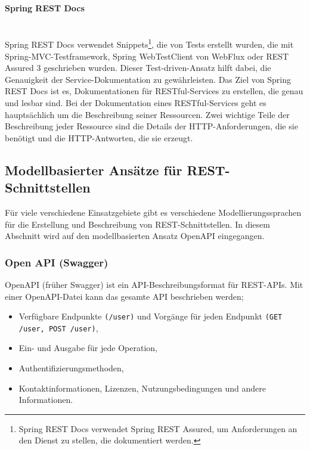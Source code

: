 \paragraph{Spring REST Docs}\mbox{}\\

Spring REST Docs verwendet Snippets\footnote{Spring REST Docs verwendet Spring REST Assured, um Anforderungen an den Dienst zu stellen, die dokumentiert werden.}, die von Tests erstellt wurden, die mit Spring-MVC-Testframework, Spring WebTestClient von WebFlux oder REST Assured 3 geschrieben wurden. Dieser Test-driven-Ansatz hilft dabei, die Genauigkeit der Service-Dokumentation zu gewährleisten. Das Ziel von Spring REST Docs ist es, Dokumentationen für RESTful-Services zu erstellen, die genau und lesbar sind. Bei der Dokumentation eines RESTful-Services geht es hauptsächlich um die Beschreibung seiner Ressourcen. Zwei wichtige Teile der Beschreibung jeder Ressource sind die Details der HTTP-Anforderungen, die sie benötigt und die HTTP-Antworten, die sie erzeugt\cite{srd18wilkinson}.

\subsection{Modellbasierter Ansätze für REST-Schnittstellen}

Für viele verschiedene Einsatzgebiete gibt es verschiedene Modellierungssprachen für die Erstellung und Beschreibung von REST-Schnittstellen. In diesem Abschnitt wird auf den modellbasierten Ansatz OpenAPI eingegangen.

\subsubsection{Open API (Swagger)}

OpenAPI (früher Swagger) ist ein API-Beschreibungsformat für REST-APIs. Mit einer OpenAPI-Datei kann das gesamte API beschrieben werden\cite{openapi13def};

\begin{itemize}
	
	\item Verfügbare Endpunkte \texttt{(/user)} und Vorgänge für jeden Endpunkt \texttt{(GET /user, POST /user)},
	
	\item Ein- und Ausgabe für jede Operation,
	
	\item Authentifizierungsmethoden,
	
	\item Kontaktinformationen, Lizenzen, Nutzungsbedingungen und andere Informationen.
	
\end{itemize}

